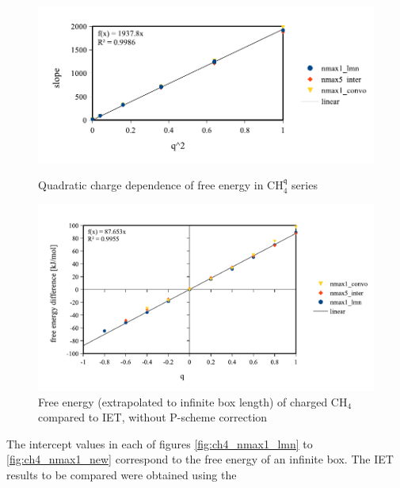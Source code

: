 \begin{figure}[!th]
\begin{centering}
\includegraphics[bb=0bp 20bp 425bp 178bp,scale=0.75]{_figure/results/ch4_slope}
\par\end{centering}
\caption{Quadratic charge dependence of free energy in $\mathrm{C}\mathrm{H}_{4}^{\mathfrak{q}}$
series\label{fig:Quadratic-charge-dependence}}

\begin{centering}
\vspace{0.33cm}
\includegraphics[bb=0bp 20bp 510bp 263bp,scale=0.75]{_figure/results/ch4_diff_energy}
\par\end{centering}
\caption[Free energy of charged $\mathrm{C}\mathrm{H}_{4}$ compared to \acs{IET},
without P-scheme correction]{Free energy (extrapolated to infinite box length) of charged $\mathrm{C}\mathrm{H}_{4}$
compared to \acs{IET}, without P-scheme correction\label{fig:Comparison-to-IET,without-correction}}
\end{figure}
The intercept values in each of figures \ref{fig:ch4_nmax1_lmn} to
\ref{fig:ch4_nmax1_new} correspond to the free energy of an infinite
box. The \acs{IET} results to be compared were obtained using the
